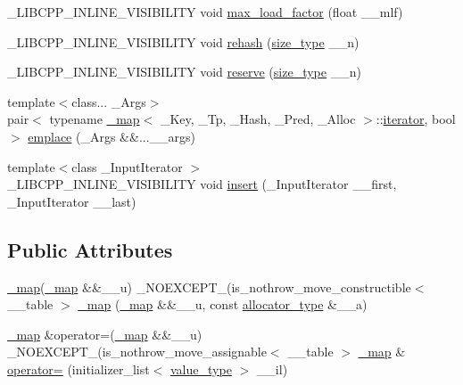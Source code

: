 \begin{DoxyCompactItemize}
\item 
\+\_\+\+L\+I\+B\+C\+P\+P\+\_\+\+I\+N\+L\+I\+N\+E\+\_\+\+V\+I\+S\+I\+B\+I\+L\+I\+T\+Y void \hyperlink{class__map_a4a1d886753e2634e24d8c5318c753f64}{max\+\_\+load\+\_\+factor} (float \+\_\+\+\_\+mlf)
\item 
\+\_\+\+L\+I\+B\+C\+P\+P\+\_\+\+I\+N\+L\+I\+N\+E\+\_\+\+V\+I\+S\+I\+B\+I\+L\+I\+T\+Y void \hyperlink{class__map_ac2d82322f2c9ffc79224c271e6f53a0c}{rehash} (\hyperlink{class__map_adc37f621be25fda072b12873e60e9fc7}{size\+\_\+type} \+\_\+\+\_\+n)
\item 
\+\_\+\+L\+I\+B\+C\+P\+P\+\_\+\+I\+N\+L\+I\+N\+E\+\_\+\+V\+I\+S\+I\+B\+I\+L\+I\+T\+Y void \hyperlink{class__map_a9dc37c2afafe865039cf449cf301c25d}{reserve} (\hyperlink{class__map_adc37f621be25fda072b12873e60e9fc7}{size\+\_\+type} \+\_\+\+\_\+n)
\item 
{\footnotesize template$<$class... \+\_\+\+Args$>$ }\\pair$<$ typename \hyperlink{class__map}{\+\_\+map}$<$ \+\_\+\+Key, \+\_\+\+Tp, \+\_\+\+Hash, \+\_\+\+Pred, \+\_\+\+Alloc $>$\+::\hyperlink{class__map_a9ed817d33532f34fc46649b3fbe8e612}{iterator}, bool $>$ \hyperlink{class__map_a3a5682741d86ff5b8ce11a573aa82aa8}{emplace} (\+\_\+\+Args \&\&...\+\_\+\+\_\+args)
\item 
{\footnotesize template$<$class \+\_\+\+Input\+Iterator $>$ }\\\+\_\+\+L\+I\+B\+C\+P\+P\+\_\+\+I\+N\+L\+I\+N\+E\+\_\+\+V\+I\+S\+I\+B\+I\+L\+I\+T\+Y void \hyperlink{class__map_a8631f67f3366a52cc2c220be87188fd5}{insert} (\+\_\+\+Input\+Iterator \+\_\+\+\_\+first, \+\_\+\+Input\+Iterator \+\_\+\+\_\+last)
\end{DoxyCompactItemize}
\subsection*{Public Attributes}
\begin{DoxyCompactItemize}
\item 
\hyperlink{class__map}{\+\_\+map}(\hyperlink{class__map}{\+\_\+map} \&\&\+\_\+\+\_\+u) \+\_\+\+N\+O\+E\+X\+C\+E\+P\+T\+\_\+(is\+\_\+nothrow\+\_\+move\+\_\+constructible$<$ \+\_\+\+\_\+table $>$ \hyperlink{class__map_ab80a3b67fd9ac75a76a8e67ed145ec49}{\+\_\+map} (\hyperlink{class__map}{\+\_\+map} \&\&\+\_\+\+\_\+u, const \hyperlink{class__map_ab38dd0bcf1867887afc2be61257ef025}{allocator\+\_\+type} \&\+\_\+\+\_\+a)
\item 
\hyperlink{class__map}{\+\_\+map} \&operator=(\hyperlink{class__map}{\+\_\+map} \&\&\+\_\+\+\_\+u) \+\_\+\+N\+O\+E\+X\+C\+E\+P\+T\+\_\+(is\+\_\+nothrow\+\_\+move\+\_\+assignable$<$ \+\_\+\+\_\+table $>$ \hyperlink{class__map}{\+\_\+map} \& \hyperlink{class__map_a296cacc5b7bac84a0e4dbbbd45f7b6b1}{operator=} (initializer\+\_\+list$<$ \hyperlink{class__map_a840dcfbf8726d7ecdd0298ffc6afde52}{value\+\_\+type} $>$ \+\_\+\+\_\+il)
\end{DoxyCompactItemize}


